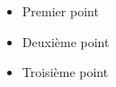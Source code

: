 \documentclass{article}
\begin{document}
\begin{itemize}
    \item Premier point
    \item Deuxième point
    \item Troisième point
\end{itemize}
\end{document}
